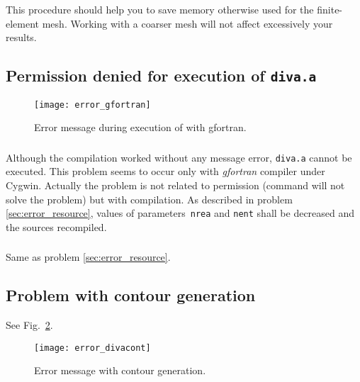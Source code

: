 This procedure should help you to save memory otherwise used for the finite-element mesh. Working with a coarser mesh will not affect excessively your results.


\subsection{Permission denied for execution of \texttt{diva.a}\label{sec:error_gfortran}}


\begin{figure}[htpb]
\centering
\texttt{[image: error\_gfortran]}
\caption{Error message during execution of  with gfortran\label{fig:error_gfortran}.}
\end{figure}

\subsubsection{\question}

Although the compilation worked without any message error, \texttt{diva.a} cannot be executed. This problem seems to occur only with \textsl{gfortran} compiler under \textsf{Cygwin}. Actually the problem is not related to permission (command  will not solve the problem) but with compilation. As described in problem \ref{sec:error_resource}, values of parameters\, \texttt{nrea} and \texttt{nent} shall be decreased and the sources recompiled.

\subsubsection{\answer}

Same as problem \ref{sec:error_resource}. 




\subsection{Problem with contour generation}

See Fig.~\ref{error:cont}.

\begin{figure}[htpb]
\centering
\texttt{[image: error\_divacont]}
\caption{Error message with contour generation.\label{error:cont}}
\end{figure}

